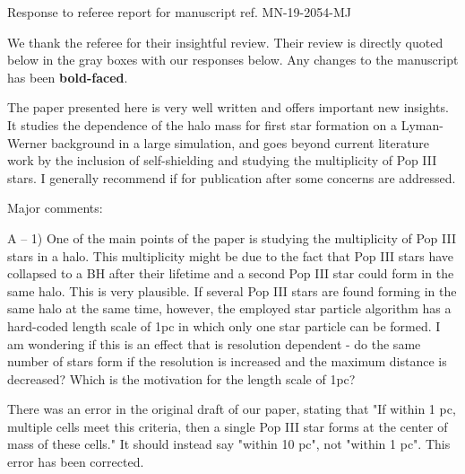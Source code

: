 \documentclass[11pt]{article}
\newenvironment{referee}[1][]{%
    \ignorespaces%
    \begin{mdframed}[style=myquotestyle,#1]%
}{%
    \end{mdframed}%
    \ignorespacesafterend%
}%
\begin{document}
\begin{center} 
\bfseries{
\begin{large}
  Response to referee report for manuscript ref. MN-19-2054-MJ
\end{large}
}
\end{center}

We thank the referee for their insightful review.  Their review is directly quoted below in the gray boxes with our responses below.  Any changes to the manuscript has been \textbf{bold-faced}.

\begin{referee}
The paper presented here is very well written and offers important new insights.  It studies the dependence of the halo mass for first star formation on a Lyman-Werner background in a large simulation, and goes beyond current literature work by the inclusion of self-shielding and studying the multiplicity of Pop III stars. I generally recommend if for publication after some concerns are addressed.
\end{referee}


\begin{referee}
Major comments:

A -- 1) One of the main points of the paper is studying the multiplicity of Pop III stars in a halo. This multiplicity might be due to the fact that Pop III stars have collapsed to a BH after their lifetime and a second Pop III star could form in the same halo. This is very plausible. If several Pop III stars are found forming in the same halo at the same time, however, the employed star particle algorithm has a hard-coded length scale of 1pc in which only one star particle can be formed. I am wondering if this is an effect that is resolution dependent - do the same number of stars form if the resolution is increased and the maximum distance is decreased? Which is the motivation for the length scale of 1pc?
\end{referee}

There was an error in the original draft of our paper, stating that "If within 1 pc, multiple cells meet this criteria, then a single Pop III star forms at the center of mass of these cells." It should instead say "within 10 pc", not "within 1 pc". This error has been corrected.
\end{document}
